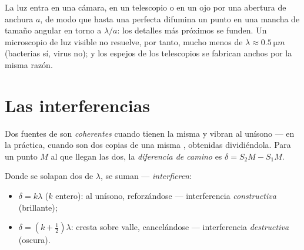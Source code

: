 \begin{remark}\label{rem:g12:light-as-wave:limits}
La luz entra en una cámara, en un telescopio o en un ojo por una
abertura de anchura $a$, de modo que hasta una  perfecta difumina
un punto en una mancha de tamaño angular en torno a $\lambda/a$: los
detalles más próximos se funden. Un microscopio de luz visible no
resuelve, por tanto, mucho menos de
$\lambda \approx \qty{0.5}{\micro m}$ (bacterias sí, virus no); y los
espejos de los telescopios se fabrican anchos por la misma razón.
\end{remark}

\section{Las interferencias}

\begin{definition}\label{def:g12:light-as-wave:coherent}
Dos fuentes de  son \emph{coherentes}
cuando tienen la misma  y vibran al unísono --- en la
práctica, cuando son dos copias de una misma , obtenidas
dividiéndola. Para un punto $M$ al que llegan las dos, la
\emph{diferencia de camino} es
$\delta = S_2M - S_1M$.
\end{definition}

\begin{proposition}\label{prop:g12:light-as-wave:conditions}
Donde se solapan dos   de  $\lambda$, se
suman --- \emph{interfieren}:
\begin{itemize}
  \item $\delta = k\lambda$ ($k$ entero): al unísono, reforzándose ---
        interferencia \emph{constructiva} (brillante);
  \item $\delta = (k + \tfrac12)\lambda$: cresta sobre valle,
        cancelándose --- interferencia
        \emph{destructiva} (oscura).
\end{itemize}
\end{proposition}

